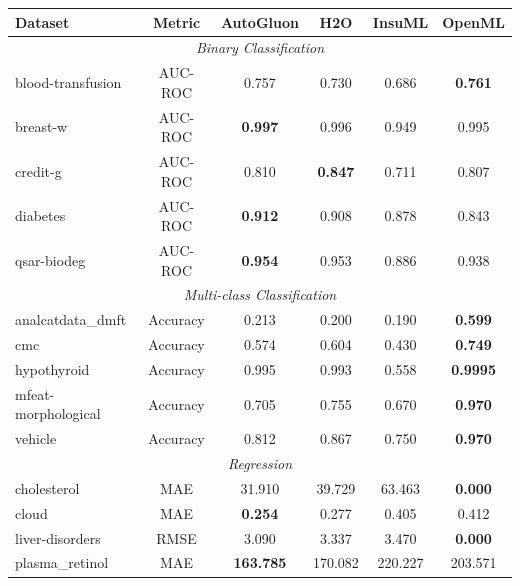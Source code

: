 \begin{center}
\tiny
\begin{tabular}{lccccc}
\toprule
\textbf{Dataset} & \textbf{Metric} & \textbf{AutoGluon} & \textbf{H2O} & \textbf{InsuML} & \textbf{OpenML} \\
\midrule
\multicolumn{6}{c}{\textit{Binary Classification}} \\
\midrule
blood-transfusion & AUC-ROC & 0.757 & 0.730 & 0.686 & \textbf{0.761} \\
breast-w & AUC-ROC & \textbf{0.997} & 0.996 & 0.949 & 0.995 \\
credit-g & AUC-ROC & 0.810 & \textbf{0.847} & 0.711 & 0.807 \\
diabetes & AUC-ROC & \textbf{0.912} & 0.908 & 0.878 & 0.843 \\
qsar-biodeg & AUC-ROC & \textbf{0.954} & 0.953 & 0.886 & 0.938 \\
\midrule
\multicolumn{6}{c}{\textit{Multi-class Classification}} \\
\midrule
analcatdata\_dmft & Accuracy & 0.213 & 0.200 & 0.190 & \textbf{0.599} \\
cmc & Accuracy & 0.574 & 0.604 & 0.430 & \textbf{0.749} \\
hypothyroid & Accuracy & 0.995 & 0.993 & 0.558 & \textbf{0.9995} \\
mfeat-morphological & Accuracy & 0.705 & 0.755 & 0.670 & \textbf{0.970} \\
vehicle & Accuracy & 0.812 & 0.867 & 0.750 & \textbf{0.970} \\
\midrule
\multicolumn{6}{c}{\textit{Regression}} \\
\midrule
cholesterol & MAE & 31.910 & 39.729 & 63.463 & \textbf{0.000} \\
cloud & MAE & \textbf{0.254} & 0.277 & 0.405 & 0.412 \\
liver-disorders & RMSE & 3.090 & 3.337 & 3.470 & \textbf{0.000} \\
plasma\_retinol & MAE & \textbf{163.785} & 170.082 & 220.227 & 203.571 \\
\bottomrule
\end{tabular}
\end{center}






